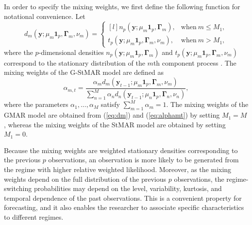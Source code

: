 \documentclass[nojss]{jss} %
\begin{document}
In order to specify the mixing weights, we first define the following function for notational convenience. Let
\begin{equation}\label{eq:dm}
d_m(\boldsymbol{y};\mu_m\mathbf{1}_p,\boldsymbol{\Gamma}_m,\nu_m)=
\left\{\begin{matrix*}[l]
 n_p(\boldsymbol{y};\mu_m\mathbf{1}_p,\boldsymbol{\Gamma}_m), & \text{when} \ m\leq M_1, \\
 t_p(\boldsymbol{y};\mu_m\mathbf{1}_p,\boldsymbol{\Gamma}_m,\nu_m), & \text{when} \ m > M_1,
\end{matrix*}\right.
\end{equation}
where the $p$-dimensional densities $n_p(\boldsymbol{y};\mu_m\mathbf{1}_p,\boldsymbol{\Gamma}_m)$ and $t_p(\boldsymbol{y};\mu_m\mathbf{1}_p,\boldsymbol{\Gamma}_m,\nu_m)$ correspond to the stationary distribution of the $m$th component process \cite[given, for example, in][Equations (2.3) and (2.8)]{Virolainen:2020}. The mixing weights of the G-StMAR model are defined as
\begin{equation}\label{eq:alphamt}
\alpha_{m,t}=\frac{\alpha_m d_m(\boldsymbol{y}_{t-1};\mu_m\mathbf{1}_p,\boldsymbol{\Gamma}_m,\nu_m)}{\sum_{n=1}^{M}\alpha_n d_n(\boldsymbol{y}_{t-1};\mu_n\mathbf{1}_p,\boldsymbol{\Gamma}_n,\nu_n)},
\end{equation}
where the parameters $\alpha_1,...,\alpha_M$ satisfy $\sum_{m=1}^M\alpha_m=1$. The mixing weights of the GMAR model are obtained from (\ref{eq:dm}) and (\ref{eq:alphamt}) by setting $M_1=M$, whereas the mixing weights of the StMAR model are obtained by setting $M_1=0$.

Because the mixing weights are weighted stationary densities corresponding to the previous $p$ observations, an observation is more likely to be generated from the regime with higher relative weighted likelihood. Moreover, as the mixing weights depend on the full distribution of the previous $p$ observations, the regime-switching probabilities may depend on the level, variability, kurtosis, and temporal dependence of the past observations. This is a convenient property for forecasting, and it also enables the researcher to associate specific characteristics to different regimes.
\end{document}
